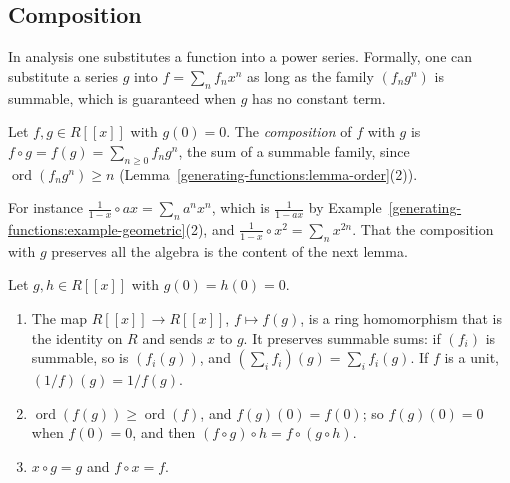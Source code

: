 \subsection{Composition}\label{generating-functions:subsection-composition}

In analysis one substitutes a function into a power series. Formally, one can substitute a series $g$ into $f = \sum_nf_nx^n$ as long as the family $(f_ng^n)$ is summable, which is guaranteed when
$g$ has no constant term.

\begin{definition}\label{generating-functions:definition-composition}
Let $f, g \in R[[x]]$ with $g(0) = 0$. The \emph{composition} of $f$ with $g$ is $f \circ g = f(g) = \sum_{n \geq 0}f_ng^n$, the sum of a summable family, since $\operatorname{ord}(f_ng^n) \geq n$
(Lemma~\ref{generating-functions:lemma-order}(2)).
\end{definition}

For instance $\frac{1}{1 - x} \circ ax = \sum_na^nx^n$, which is $\frac{1}{1 - ax}$ by Example~\ref{generating-functions:example-geometric}(2), and $\frac{1}{1 - x} \circ x^2 = \sum_nx^{2n}$. That
the composition with $g$ preserves all the algebra is the content of the next lemma.

\begin{lemma}\label{generating-functions:lemma-composition}
Let $g, h \in R[[x]]$ with $g(0) = h(0) = 0$.
\begin{enumerate}
\item The map $R[[x]] \to R[[x]]$, $f \mapsto f(g)$, is a ring homomorphism that is the identity on $R$ and sends $x$ to $g$. It preserves summable sums: if $(f_i)$ is summable, so is $(f_i(g))$,
and $(\sum_if_i)(g) = \sum_if_i(g)$. If $f$ is a unit, $(1/f)(g) = 1/f(g)$.
\item $\operatorname{ord}(f(g)) \geq \operatorname{ord}(f)$, and $f(g)(0) = f(0)$; so $f(g)(0) = 0$ when $f(0) = 0$, and then $(f \circ g) \circ h = f \circ (g \circ h)$.
\item $x \circ g = g$ and $f \circ x = f$.
\end{enumerate}
\end{lemma}

